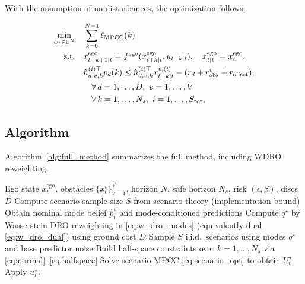 \documentclass[letterpaper,10pt,conference]{ieeeconf}
\begin{document}
With the assumption of no disturbances, the optimization follows:

\begin{subequations}\label{eq:scenario_opt}
\begin{align}
\min_{U_t \in \mathbb{U}^N}\quad &
\sum_{k=0}^{N-1} \ell_{\mathrm{MPCC}}(k) \label{eq:obj}\\
\text{s.t.}\quad &
x_{t+k+1|t}^{\mathrm{ego}} = f^{\mathrm{ego}}(x_{t+k|t}^{\mathrm{ego}}, u_{t+k|t}),
\quad x_{t|t}^{\mathrm{ego}} = x_t^{\mathrm{ego}}, \label{eq:dyn_constr}\\
& \hat{n}_{d,v,k}^{(i)\top} p_d(k)
\le
\hat{n}_{d,v,k}^{(i)\top} x^{v,(i)}_{t+k|t}
- (r_d + r_{\mathrm{obs}}^v + r_{\mathrm{offset}}), \label{eq:coll_constr}\\
& \quad \forall\, d=1,\dots,D,\ v=1,\dots,V \notag \\
& \quad \forall\, k=1,\dots,N_s,\ i=1,\dots,S_{\mathrm{tot}},
\nonumber
\end{align}
\end{subequations}

\subsection{Algorithm}\label{sec:algorithm}

Algorithm~\ref{alg:full_method} summarizes the full method, including WDRO reweighting.
\begin{algorithm}[ht!]
\caption{Scenario Safe Horizon MPCC with WDRO reweighting}\label{alg:full_method}
\begin{algorithmic}[1]
\Require Ego state $x_t^{\mathrm{ego}}$, obstacles $\{x_t^v\}_{v=1}^V$, horizon $N$, safe horizon $N_s$, risk $(\epsilon,\beta)$, discs $D$
\State Compute scenario sample size $S$ from scenario theory (implementation bound)
        \State Obtain nominal mode belief $\widehat{p}_t^v$ and mode-conditioned predictions
       \State Compute $q^\star$ by Wasserstein-DRO reweighting in \eqref{eq:w_dro_modes}
(equivalently dual \eqref{eq:w_dro_dual}) using ground cost $D$
    \EndFor
    \State Sample $S$ i.i.d.\ scenarios using modes $q^\star$ and base predictor noise
    \State Build half-space constraints over $k=1,\dots,N_s$ via \eqref{eq:normal}--\eqref{eq:halfspace}
    \State Solve scenario MPCC \eqref{eq:scenario_opt} to obtain $U_t^\star$
    \State Apply $u_{t|t}^\star$
\EndFor
\end{algorithmic}
\end{algorithm}
\end{document}
